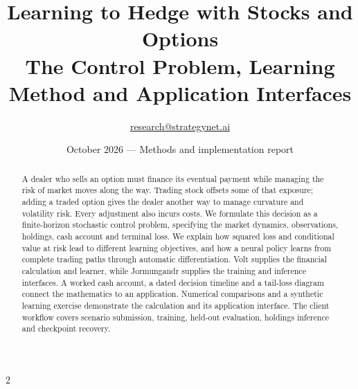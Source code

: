 \documentclass[8pt]{strategynet-journal}
\title{Learning to Hedge with Stocks and Options\\\large The Control Problem, Learning Method and Application Interfaces}
\author{\href{mailto:research@strategynet.ai}{research@strategynet.ai}}
\date{October 2026 --- Methods and implementation report}
\begin{document}
\maketitle
\begin{abstract}
\normalsize A dealer who sells an option must finance its eventual payment while managing the risk of market moves along the way. Trading stock offsets some of that exposure; adding a traded option gives the dealer another way to manage curvature and volatility risk. Every adjustment also incurs costs. We formulate this decision as a finite-horizon stochastic control problem, specifying the market dynamics, observations, holdings, cash account and terminal loss. We explain how squared loss and conditional value at risk lead to different learning objectives, and how a neural policy learns from complete trading paths through automatic differentiation. Volt supplies the financial calculation and learner, while Jormungandr supplies the training and inference interfaces. A worked cash account, a dated decision timeline and a tail-loss diagram connect the mathematics to an application. Numerical comparisons and a synthetic learning exercise demonstrate the calculation and its application interface. The client workflow covers scenario submission, training, held-out evaluation, holdings inference and checkpoint recovery.
\end{abstract}
\begin{multicols}{2}
\tableofcontents
\end{multicols}
\thispagestyle{fancy}
\clearpage
\end{document}
